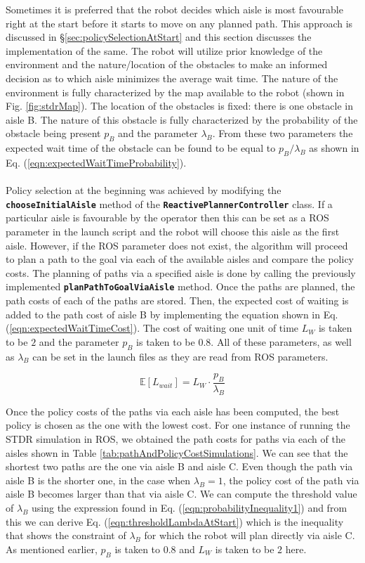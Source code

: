 \documentclass[a4paper,12pt]{article}
\begin{document}
		Sometimes it is preferred that the robot decides which aisle is most favourable right at the start before it starts to move on any planned path. This approach is discussed in \S \ref{sec:policySelectionAtStart} and this section discusses the implementation of the same. The robot will utilize prior knowledge of the environment and the nature/location of the obstacles to make an informed decision as to which aisle minimizes the average wait time. The nature of the environment is fully characterized by the map available to the robot (shown in Fig. \ref{fig:stdrMap}). The location of the obstacles is fixed: there is one obstacle in aisle B. The nature of this obstacle is fully characterized by the probability of the obstacle being present $p_B$ and the parameter $\lambda_B$. From these two parameters the expected wait time of the obstacle can be found to be equal to $p_B/\lambda_B$ as shown in Eq. (\ref{eqn:expectedWaitTimeProbability}).
		\\
		\\
		Policy selection at the beginning was achieved by modifying the \textbf{\texttt{chooseInitialAisle}} method of the \textbf{\texttt{ReactivePlannerController}} class. If a particular aisle is favourable by the operator then this can be set as a ROS parameter in the launch script and the robot will choose this aisle as the first aisle. However, if the ROS parameter does not exist, the algorithm will proceed to plan a path to the goal via each of the available aisles and compare the policy costs. The planning of paths via a specified aisle is done by calling the previously implemented \texttt{\textbf{planPathToGoalViaAisle}} method. Once the paths are planned, the path costs of each of the paths are stored. Then, the expected cost of waiting is added to the path cost of aisle B by implementing the equation shown in Eq. (\ref{eqn:expectedWaitTimeCost}). The cost of waiting one unit of time $L_W$ is taken to be $2$ and the parameter $p_B$ is taken to be $0.8$. All of these parameters, as well as $\lambda_B$ can be set in the launch files as they are read from ROS parameters.
		
		\begin{equation}
			\mathbb{E}[L_{wait}]=L_W \cdot \frac{p_B}{\lambda_B}
		\label{eqn:expectedWaitTimeCost}
		\end{equation}
		
		Once the policy costs of the paths via each aisle has been computed, the best policy is chosen as the one with the lowest cost. For one instance of running the STDR simulation in ROS, we obtained the path costs for paths via each of the aisles shown in Table \ref{tab:pathAndPolicyCostSimulations}. We can see that the shortest two paths are the one via aisle B and aisle C. Even though the path via aisle B is the shorter one, in the case when $\lambda_B=1$, the policy cost of the path via aisle B becomes larger than that via aisle C. We can compute the threshold value of $\lambda_B$ using the expression found in Eq. (\ref{eqn:probabilityInequality1}) and from this we can derive Eq. (\ref{eqn:thresholdLambdaAtStart}) which is the inequality that shows the constraint of $\lambda_B$ for which the robot will plan directly via aisle C. As mentioned earlier, $p_B$ is taken to $0.8$ and $L_W$ is taken to be $2$ here.
		
\end{document}

